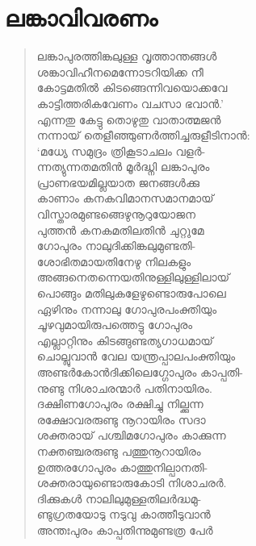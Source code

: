 
\section{ലങ്കാവിവരണം}

\begin{verse}
ലങ്കാപുരത്തിങ്കലുള്ള വൃത്താന്തങ്ങള്‍\\
ശങ്കാവിഹീനമെന്നോടറിയിക്ക നീ\\
കോട്ടമതില്‍ കിടങ്ങെന്നിവയൊക്കവേ\\
കാട്ടിത്തരികവേണം വചസാ ഭവാന്‍.’\\
എന്നതു കേട്ടു തൊഴുതു വാതാത്മജന്‍\\
നന്നായ് തെളീഞ്ഞുണര്‍ത്തിച്ചരുളീടിനാന്‍:\\
‘മധ്യേ സമുദ്രം ത്രികൂടാചലം വളര്‍-\\
ന്നത്യുന്നതമതിന്‍ മൂര്‍ദ്ധ്നി ലങ്കാപുരം\\
പ്രാണഭയമില്ലയാത  ജനങ്ങള്‍ക്കു\\
കാണാം കനകവിമാനസമാനമായ്\\
വിസ്താരമുണ്ടങ്ങെഴുനൂറുയോജന\\
പുത്തന്‍ കനകമതിലതിന്‍ ചുറ്റുമേ\\
ഗോപുരം നാലുദിക്കിങ്കലുമുണ്ടതി-\\
ശോഭിതമായതിനേഴു നിലകളും\\
അങ്ങനെതന്നെയതിനുള്ളിലുള്ളിലായ്\\
പൊങ്ങും മതിലുകളേഴുണ്ടൊരുപോലെ\\
ഏഴിനും നന്നാലു ഗോപുരപംക്തിയും\\
ചൂഴവുമായിരുപത്തെട്ടു ഗോപുരം\\
എല്ലാറ്റിനും കിടങ്ങുണ്ടത്യഗാധമായ്\\
ചൊല്ലുവാന്‍ വേല യന്ത്രപ്പാലപംക്തിയും\\
അണ്ടര്‍കോന്‍ദിക്കിലെഗ്ഗോപുരം കാപ്പതി-\\
നുണ്ടു നിശാചരന്മാര്‍ പതിനായിരം.\\
ദക്ഷിണഗോപുരം രക്ഷിച്ചു നില്ക്കുന്ന\\
രക്ഷോവരരുണ്ടു നൂറായിരം സദാ\\
ശക്തരായ് പശ്ചിമഗോപുരം കാക്കുന്ന\\
നക്തഞ്ചരരുണ്ടു പത്തുനൂറായിരം\\
ഉത്തരഗോപുരം കാത്തുനില്പാനതി-\\
ശക്തരായുണ്ടൊരുകോടി നിശാചരര്‍.\\
ദിക്കുകള്‍ നാലിലുമുള്ളതിലര്‍ദ്ധമു-\\
ണ്ടുഗ്രതയോടു നടുവു കാത്തീടുവാന്‍\\
അന്തഃപുരം കാപ്പതിന്നുമുണ്ടത്ര പേര്‍\\

\end{verse}
